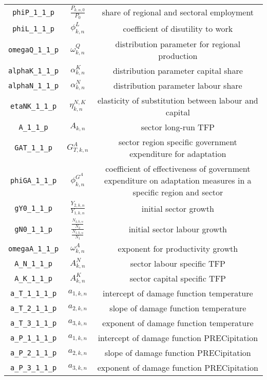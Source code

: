 \begin{center}
\begin{longtable}{ccc}
\texttt{phiP\_1\_1\_p} & $\frac{P_{k,n,0}}{P_{0}}$ & share of regional and sectoral employment\\
\texttt{phiL\_1\_1\_p} & ${\phi^{L}_{k,n}}$ & coefficient of disutility to work\\
\texttt{omegaQ\_1\_1\_p} & ${\omega^{Q}_{k,n}}$ & distribution parameter for regional production\\
\texttt{alphaK\_1\_1\_p} & ${\alpha^{K}_{k,n}}$ & distribution parameter capital share\\
\texttt{alphaN\_1\_1\_p} & ${\alpha^{N}_{k,n}}$ & distribution parameter labour share\\
\texttt{etaNK\_1\_1\_p} & ${\eta^{N,K}_{k,n}}$ & elasticity of substitution between labour and capital\\
\texttt{A\_1\_1\_p} & ${A_{k,n}}$ & sector long-run TFP\\
\texttt{GAT\_1\_1\_p} & ${G^{A}_{T,k,n}}$ & sector region specific government expenditure for adaptation\\
\texttt{phiGA\_1\_1\_p} & ${\phi^{G^{A}}_{k,n}}$ & coefficient of effectiveness of government expenditure on adaptation measures in a specific region and sector\\
\texttt{gY0\_1\_1\_p} & ${\frac{Y_{2,k,n}}{Y_{1,k,n}}}$ & initial sector growth\\
\texttt{gN0\_1\_1\_p} & $\frac{\frac{N_{2,k,n}}{N_{2}}}{\frac{N_{1,k,n}}{N_{1}}}$ & initial sector labour growth\\
\texttt{omegaA\_1\_1\_p} & ${\omega^{A}_{k,n}}$ & exponent for productivity growth\\
\texttt{A\_N\_1\_1\_p} & ${A^{N}_{k,n}}$ & sector labour specific TFP\\
\texttt{A\_K\_1\_1\_p} & ${A^{K}_{k,n}}$ & sector capital specific TFP\\
\texttt{a\_T\_1\_1\_1\_p} & ${a_{1,k,n}}$ & intercept of damage function temperature\\
\texttt{a\_T\_2\_1\_1\_p} & ${a_{2,k,n}}$ & slope of damage function temperature\\
\texttt{a\_T\_3\_1\_1\_p} & ${a_{3,k,n}}$ & exponent of damage function temperature\\
\texttt{a\_P\_1\_1\_1\_p} & ${a_{1,k,n}}$ & intercept of damage function PRECipitation\\
\texttt{a\_P\_2\_1\_1\_p} & ${a_{2,k,n}}$ & slope of damage function PRECipitation\\
\texttt{a\_P\_3\_1\_1\_p} & ${a_{3,k,n}}$ & exponent of damage function PRECipitation\\

\end{longtable}
\end{center}
